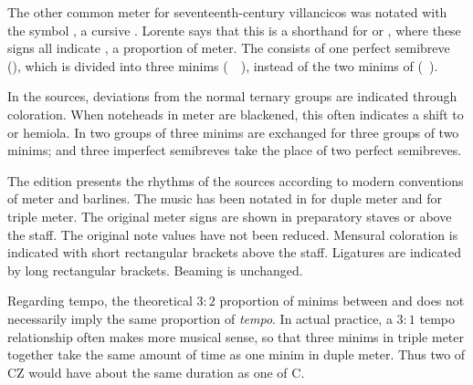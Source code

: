 The other common meter for seventeenth-century villancicos was notated with the 
symbol \meterCZorig{}, a cursive \meterCZ{}.
Lorente says that this is a shorthand for \meterCThreeTwo{} or \meterCThree{},
where these signs all indicate , a 
proportion of \meterC{} meter.%
  \autocite[165]{Lorente:Porque}
The  consists of one perfect semibreve (\musSemibreveDotted), which
is divided into three minims (\musMinim\ \musMinim\ \musMinim), instead of the
two minims of \meterC{} (\musMinim\ \musMinim).

In the sources, deviations from the normal ternary groups are indicated through 
coloration. 
When noteheads in \meterCThree{} meter are blackened, this often indicates a
shift to  or hemiola.
In  two groups of three minims are exchanged for three 
groups of two minims; and three imperfect semibreves take the place of two
perfect semibreves.

The edition presents the rhythms of the sources according to modern conventions 
of meter and barlines.
The music has been notated in \meterC{} for duple meter and \meterCThree{}
for triple meter.
The original meter signs are shown in preparatory staves or above the staff.
The original note values have not been reduced.
Mensural coloration is indicated with short rectangular brackets above the 
staff.
Ligatures are indicated by long rectangular brackets.
Beaming is unchanged.

Regarding tempo, the theoretical $3:2$ proportion of minims between
\meterCThreeTwo{} and \meterC{} does not necessarily imply the same proportion of
\emph{tempo}.  
In actual practice, a $3:1$ tempo relationship often makes more musical sense,
so that three minims in triple meter together take the same amount of time as
one minim in duple meter.
Thus two  of CZ would have about the same duration as one 
 of C.


